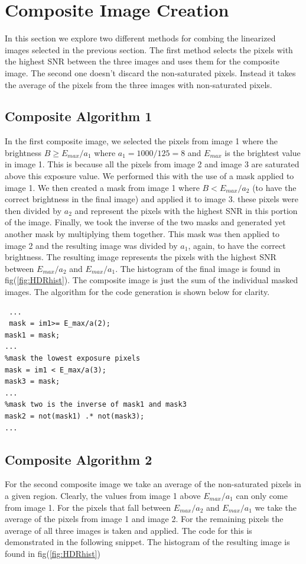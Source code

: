\documentclass[a4paper]{article}
\begin{document}
\FloatBarrier
\section{Composite Image Creation}
In this section we explore two different methods for combing the linearized images selected in the previous section. The first method selects the pixels with the highest SNR between the three images and uses them for the composite image.  The second one doesn't discard the non-saturated pixels.  Instead it takes the average of the pixels from the three images with non-saturated pixels. 

\subsection{Composite Algorithm 1}
 In the first composite image, we selected the pixels from image 1 where the brightness $B \ge E_{max} /a_1$ where $a_1 = 1000/125 = 8$ and $E_{max}$ is the brightest value in image 1. This is because all the pixels from image 2 and image 3 are saturated above this exposure value.  We performed this with the use of a mask applied to image 1.  We then created a mask from image 1 where $B  <E_{max} /a_2$ (to have the correct brightness in the final image)  and applied it to image 3.  these  pixels were then  divided by $a_2$ and represent the pixels with the highest SNR in this portion of the image.  Finally, we took the inverse of the two masks and generated yet another mask by multiplying them together.  This mask was then applied to image 2 and the resulting image was  divided by $a_1$, again,  to have the correct brightness.  The resulting image represents the pixels with the highest SNR between $E_{max}/a_{2}$ and $E_{max}/a_1$. The histogram of the final image is found in fig(\ref{fig:HDRhist}). The composite image is just the sum of the individual masked images.  The algorithm for the code generation is shown below for clarity.
 \begin{verbatim}
 ...
 mask = im1>= E_max/a(2);
mask1 = mask;
...
%mask the lowest exposure pixels
mask = im1 < E_max/a(3);
mask3 = mask;
...
%mask two is the inverse of mask1 and mask3
mask2 = not(mask1) .* not(mask3);
...
 \end{verbatim}

\FloatBarrier
\subsection{Composite Algorithm 2}
For the second composite image we take an average of the non-saturated pixels in a given region.  Clearly, the values from image 1 above $E_{max}/a_1$ can only come from image 1.  For the pixels that fall between  $E_{max}/a_{2}$ and $E_{max}/a_1$ we take the average of the pixels from image 1 and image 2.  For the remaining pixels the average of all three images is taken and applied.  The code for this is demonstrated in the following snippet. The histogram of the resulting image is found in fig(\ref{fig:HDRhist}) 
\end{document}
